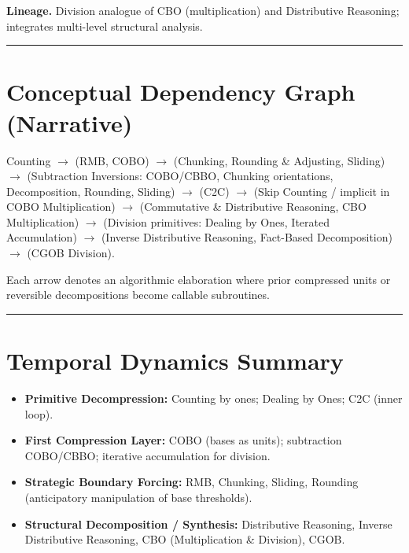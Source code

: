 \documentclass[
]{article}
\providecommand{\tightlist}{%
  \setlength{\itemsep}{0pt}\setlength{\parskip}{0pt}}
\begin{document}
\textbf{Lineage.} Division analogue of CBO (multiplication) and
Distributive Reasoning; integrates multi-level structural analysis.

\begin{center}\rule{0.5\linewidth}{0.5pt}\end{center}

\section{Conceptual Dependency Graph
(Narrative)}\label{conceptual-dependency-graph-narrative}

Counting \(\to\) (RMB, COBO) \(\to\) (Chunking, Rounding \& Adjusting,
Sliding) \(\to\) (Subtraction Inversions: COBO/CBBO, Chunking
orientations, Decomposition, Rounding, Sliding) \(\to\) (C2C) \(\to\)
(Skip Counting / implicit in COBO Multiplication) \(\to\) (Commutative
\& Distributive Reasoning, CBO Multiplication) \(\to\) (Division
primitives: Dealing by Ones, Iterated Accumulation) \(\to\) (Inverse
Distributive Reasoning, Fact-Based Decomposition) \(\to\) (CGOB
Division).

Each arrow denotes an algorithmic elaboration where prior compressed
units or reversible decompositions become callable subroutines.

\begin{center}\rule{0.5\linewidth}{0.5pt}\end{center}

\section{Temporal Dynamics Summary}\label{temporal-dynamics-summary}

\begin{itemize}
\tightlist
\item
  \textbf{Primitive Decompression:} Counting by ones; Dealing by Ones;
  C2C (inner loop).
\item
  \textbf{First Compression Layer:} COBO (bases as units); subtraction
  COBO/CBBO; iterative accumulation for division.
\item
  \textbf{Strategic Boundary Forcing:} RMB, Chunking, Sliding, Rounding
  (anticipatory manipulation of base thresholds).
\item
  \textbf{Structural Decomposition / Synthesis:} Distributive Reasoning,
  Inverse Distributive Reasoning, CBO (Multiplication \& Division),
  CGOB.
\end{itemize}
\end{document}
